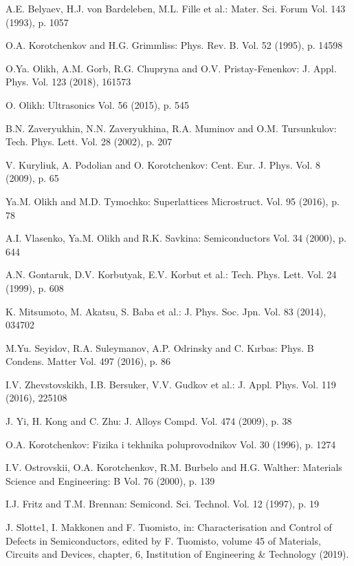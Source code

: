 \documentclass{ttp}
\begin{document}
\begin{thebibliography}{99}
 A.E. Belyaev, H.J. von Bardeleben, M.L. Fille et al.: Mater. Sci. Forum Vol. 143 (1993), p. 1057

 O.A. Korotchenkov and H.G. Grimmliss: Phys. Rev. B. Vol. 52 (1995), p. 14598

  O.Ya. Olikh, A.M. Gorb, R.G. Chupryna and O.V. Pristay-Fenenkov: J. Appl. Phys. Vol. 123 (2018), 161573

 O. Olikh: Ultrasonics Vol. 56 (2015), p. 545

 B.N. Zaveryukhin, N.N. Zaveryukhina, R.A. Muminov and O.M. Tursunkulov: Tech. Phys. Lett. Vol. 28 (2002), p. 207

 V. Kuryliuk, A. Podolian and O. Korotchenkov: Cent. Eur. J. Phys. Vol. 8 (2009), p. 65

 Ya.M. Olikh and M.D. Tymochko: Superlattices Microstruct. Vol. 95 (2016), p. 78

 A.I. Vlasenko,  Ya.M. Olikh  and R.K. Savkina: Semiconductors Vol. 34 (2000), p. 644

 A.N. Gontaruk,  D.V. Korbutyak, E.V. Korbut et al.: Tech. Phys. Lett. Vol. 24 (1999), p. 608

 K. Mitsumoto, M. Akatsu, S. Baba et al.: J. Phys. Soc. Jpn. Vol. 83 (2014), 034702

 M.Yu. Seyidov, R.A. Suleymanov, A.P. Odrinsky and C. Kırbas: Phys. B Condens. Matter Vol. 497 (2016), p. 86

 I.V. Zhevstovskikh, I.B. Bersuker, V.V. Gudkov et al.: J. Appl. Phys. Vol. 119 (2016), 225108

 J. Yi, H. Kong and C. Zhu: J. Alloys Compd. Vol. 474 (2009), p. 38

 O.A. Korotchenkov: Fizika i tekhnika poluprovodnikov Vol. 30 (1996), p. 1274

 I.V. Ostrovskii, O.A. Korotchenkov, R.M. Burbelo and H.G. Walther: Materials Science and Engineering: B Vol. 76 (2000), p. 139

 I.J. Fritz and T.M. Brennan: Semicond. Sci. Technol. Vol. 12 (1997), p. 19

 J. Slotte1, I. Makkonen and F. Tuomisto, in: Characterisation and Control of Defects 
in Semiconductors, edited by F. Tuomisto, volume 45 of Materials, Circuits and Devices, chapter,
6, Institution of Engineering \& Technology (2019).


\end{thebibliography}
\end{document}
